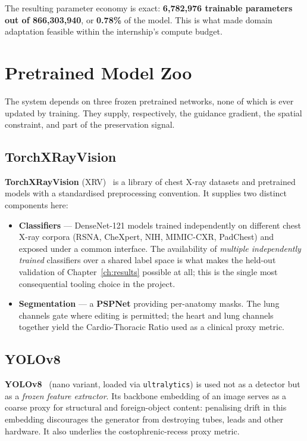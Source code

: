 The resulting parameter economy is exact: \textbf{6{,}782{,}976 trainable
parameters out of 866{,}303{,}940}, or \textbf{0.78\%} of the model. This
is what made domain adaptation feasible within the internship's compute
budget.

\section{Pretrained Model Zoo}

The system depends on three frozen pretrained networks, none of which is
ever updated by training. They supply, respectively, the guidance
gradient, the spatial constraint, and part of the preservation signal.

\subsection{TorchXRayVision}

\textbf{TorchXRayVision} (XRV)~\cite{cohen2022xrv} is a library of chest
X-ray datasets and pretrained models with a standardised preprocessing
convention. It supplies two distinct components here:

\begin{itemize}[leftmargin=*]
  \item \textbf{Classifiers} --- DenseNet-121 models trained independently
        on different chest X-ray corpora (RSNA, CheXpert, NIH, MIMIC-CXR,
        PadChest) and exposed under a common interface. The availability
        of \emph{multiple independently trained} classifiers over a
        shared label space is what makes the held-out validation of
        Chapter~\ref{ch:results} possible at all; this is the single
        most consequential tooling choice in the project.
  \item \textbf{Segmentation} --- a \textbf{PSPNet} providing per-anatomy
        masks. The lung channels gate where editing is permitted; the
        heart and lung channels together yield the Cardio-Thoracic Ratio
        used as a clinical proxy metric.
\end{itemize}

\subsection{YOLOv8}

\textbf{YOLOv8}~\cite{jocher2023yolov8} (nano variant, loaded via
\texttt{ultralytics}) is used not as a detector but as a \emph{frozen
feature extractor}. Its backbone embedding of an image serves as a
coarse proxy for structural and foreign-object content: penalising drift
in this embedding discourages the generator from destroying tubes, leads
and other hardware. It also underlies the costophrenic-recess proxy
metric.

